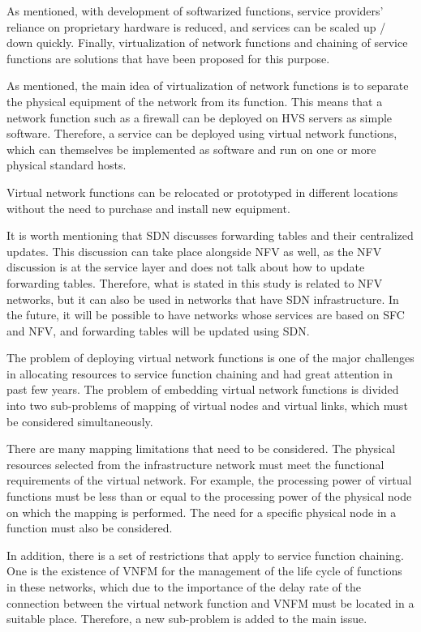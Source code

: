 As mentioned, with development of softwarized functions, service providers' reliance on proprietary hardware is reduced, and services can be scaled up / down quickly. Finally, virtualization of network functions and chaining of service functions are solutions that have been proposed for this purpose.

As mentioned, the main idea of virtualization of network functions is to separate the physical equipment of the network from its function.
This means that a network function such as a firewall can be deployed on HVS servers as simple software.
Therefore, a service can be deployed using virtual network functions, which can themselves be implemented as software and run on one or more physical standard hosts.

Virtual network functions can be relocated or prototyped in different locations without the need to purchase and install new equipment.

It is worth mentioning that SDN discusses forwarding tables and their centralized updates.
This discussion can take place alongside NFV as well, as the NFV discussion is at the service layer and does not talk about how to update forwarding tables.
Therefore, what is stated in this study is related to NFV networks, but it can also be used in networks that have SDN infrastructure.
In the future, it will be possible to have networks whose services are based on SFC and NFV, and forwarding tables will be updated using SDN.

The problem of deploying virtual network functions is one of the major challenges in allocating resources to service function chaining and had great attention in past few years.
The problem of embedding virtual network functions is divided into two sub-problems of mapping of virtual nodes and virtual links, which must be considered simultaneously.

There are many mapping limitations that need to be considered.
The physical resources selected from the infrastructure network must meet the functional requirements of the virtual network.
For example, the processing power of virtual functions must be less than or equal to the processing power of the physical node on which the mapping is performed.
The need for a specific physical node in a function must also be considered.

In addition, there is a set of restrictions that apply to service function chaining.
One is the existence of VNFM for the management of the life cycle of functions in these networks,
which due to the importance of the delay rate of the connection between the virtual network function and VNFM must be located in a suitable place.
Therefore, a new sub-problem is added to the main issue.

